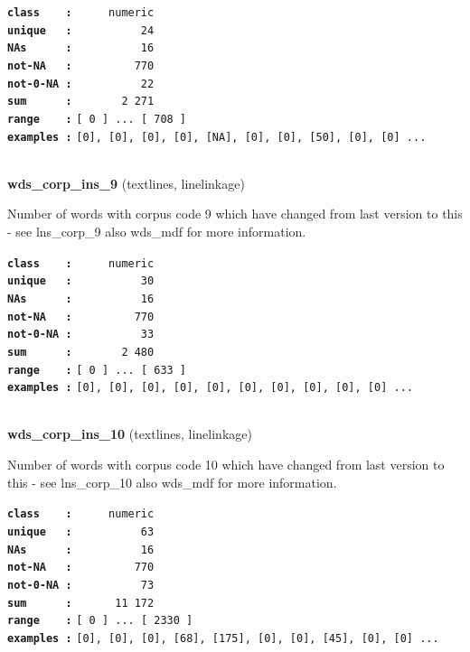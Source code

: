 \documentclass[]{article}
\begin{document}
\textbf{\texttt{class\ \ \ \ :}} \texttt{~~~~~numeric}\\
\textbf{\texttt{unique\ \ \ :}} \texttt{~~~~~~~~~~24}\\
\textbf{\texttt{NAs\ \ \ \ \ \ :}} \texttt{~~~~~~~~~~16}\\
\textbf{\texttt{not-NA\ \ \ :}} \texttt{~~~~~~~~~770}\\
\textbf{\texttt{not-0-NA\ :}} \texttt{~~~~~~~~~~22}\\
\textbf{\texttt{sum\ \ \ \ \ \ :}} \texttt{~~~~~~~2~271}\\
\textbf{\texttt{range\ \ \ \ :}}
\texttt{{[}\ 0\ {]}\ ...\ {[}\ 708\ {]}}\\
\textbf{\texttt{examples\ :}}
\texttt{{[}0{]},\ {[}0{]},\ {[}0{]},\ {[}0{]},\ {[}NA{]},\ {[}0{]},\ {[}0{]},\ {[}50{]},\ {[}0{]},\ {[}0{]}\ ...}\\

~

\textbf{wds\_corp\_ins\_9} (textlines, linelinkage)

Number of words with corpus code 9 which have changed from last version
to this - see lns\_corp\_9 also wds\_mdf for more information.

\textbf{\texttt{class\ \ \ \ :}} \texttt{~~~~~numeric}\\
\textbf{\texttt{unique\ \ \ :}} \texttt{~~~~~~~~~~30}\\
\textbf{\texttt{NAs\ \ \ \ \ \ :}} \texttt{~~~~~~~~~~16}\\
\textbf{\texttt{not-NA\ \ \ :}} \texttt{~~~~~~~~~770}\\
\textbf{\texttt{not-0-NA\ :}} \texttt{~~~~~~~~~~33}\\
\textbf{\texttt{sum\ \ \ \ \ \ :}} \texttt{~~~~~~~2~480}\\
\textbf{\texttt{range\ \ \ \ :}}
\texttt{{[}\ 0\ {]}\ ...\ {[}\ 633\ {]}}\\
\textbf{\texttt{examples\ :}}
\texttt{{[}0{]},\ {[}0{]},\ {[}0{]},\ {[}0{]},\ {[}0{]},\ {[}0{]},\ {[}0{]},\ {[}0{]},\ {[}0{]},\ {[}0{]}\ ...}\\

~

\textbf{wds\_corp\_ins\_10} (textlines, linelinkage)

Number of words with corpus code 10 which have changed from last version
to this - see lns\_corp\_10 also wds\_mdf for more information.

\textbf{\texttt{class\ \ \ \ :}} \texttt{~~~~~numeric}\\
\textbf{\texttt{unique\ \ \ :}} \texttt{~~~~~~~~~~63}\\
\textbf{\texttt{NAs\ \ \ \ \ \ :}} \texttt{~~~~~~~~~~16}\\
\textbf{\texttt{not-NA\ \ \ :}} \texttt{~~~~~~~~~770}\\
\textbf{\texttt{not-0-NA\ :}} \texttt{~~~~~~~~~~73}\\
\textbf{\texttt{sum\ \ \ \ \ \ :}} \texttt{~~~~~~11~172}\\
\textbf{\texttt{range\ \ \ \ :}}
\texttt{{[}\ 0\ {]}\ ...\ {[}\ 2330\ {]}}\\
\textbf{\texttt{examples\ :}}
\texttt{{[}0{]},\ {[}0{]},\ {[}0{]},\ {[}68{]},\ {[}175{]},\ {[}0{]},\ {[}0{]},\ {[}45{]},\ {[}0{]},\ {[}0{]}\ ...}\\
\end{document}
